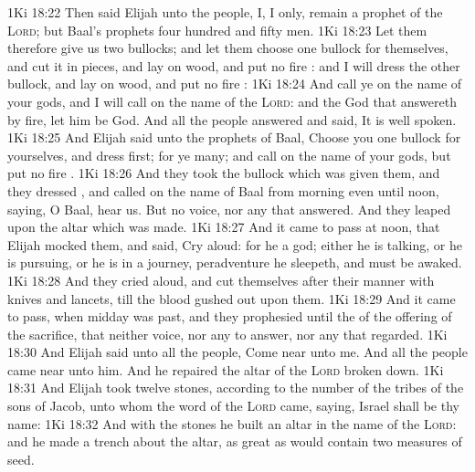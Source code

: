 \vs 1Ki 18:22 Then said Elijah unto the people, I,  I only, remain a prophet of the \textsc{Lord}; but Baal's prophets  four hundred and fifty men.
\vs 1Ki 18:23 Let them therefore give us two bullocks; and let them choose one bullock for themselves, and cut it in pieces, and lay  on wood, and put no fire : and I will dress the other bullock, and lay  on wood, and put no fire :
\vs 1Ki 18:24 And call ye on the name of your gods, and I will call on the name of the \textsc{Lord}: and the God that answereth by fire, let him be God. And all the people answered and said, It is well spoken.
\vs 1Ki 18:25 And Elijah said unto the prophets of Baal, Choose you one bullock for yourselves, and dress  first; for ye  many; and call on the name of your gods, but put no fire .
\vs 1Ki 18:26 And they took the bullock which was given them, and they dressed , and called on the name of Baal from morning even until noon, saying, O Baal, hear us. But  no voice, nor any that answered. And they leaped upon the altar which was made.
\vs 1Ki 18:27 And it came to pass at noon, that Elijah mocked them, and said, Cry aloud: for he  a god; either he is talking, or he is pursuing, or he is in a journey,  peradventure he sleepeth, and must be awaked.
\vs 1Ki 18:28 And they cried aloud, and cut themselves after their manner with knives and lancets, till the blood gushed out upon them.
\vs 1Ki 18:29 And it came to pass, when midday was past, and they prophesied until the  of the offering of the  sacrifice, that  neither voice, nor any to answer, nor any that regarded.
\vs 1Ki 18:30 And Elijah said unto all the people, Come near unto me. And all the people came near unto him. And he repaired the altar of the \textsc{Lord}  broken down.
\vs 1Ki 18:31 And Elijah took twelve stones, according to the number of the tribes of the sons of Jacob, unto whom the word of the \textsc{Lord} came, saying, Israel shall be thy name:
\vs 1Ki 18:32 And with the stones he built an altar in the name of the \textsc{Lord}: and he made a trench about the altar, as great as would contain two measures of seed.
